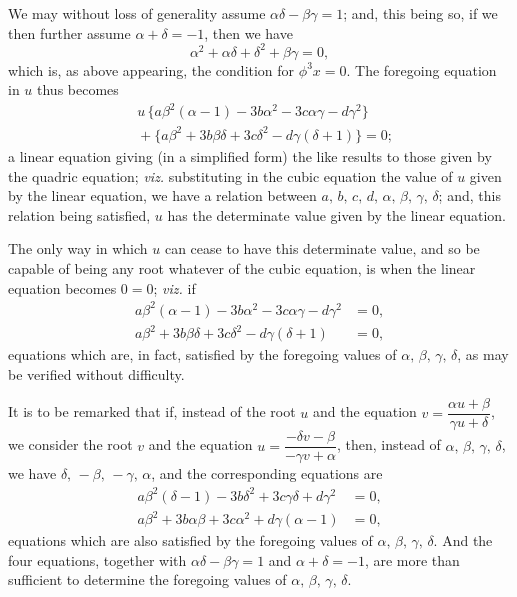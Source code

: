 \documentclass[11pt]{article}
\begin{document}
We may without loss of generality assume $\alpha \delta - \beta \gamma = 1$; and, this being so, if we
then further assume $\alpha + \delta = -1$, then we have
\[
  \alpha^{2} + \alpha \delta + \delta^{2} + \beta \gamma = 0,
\]
which is, as above appearing, the condition for $\phi^{3} x = 0$. The foregoing equation in $u$
thus becomes
\begin{align*}
  & u\,\{a \beta^{2}(\alpha - 1) - 3 b \alpha^{2} - 3 c \alpha \gamma - d \gamma^{2}\}\\
  & {} + \{a \beta^{2} + 3 b \beta \delta + 3 c \delta^{2} - d \gamma(\delta + 1)\} = 0;
\end{align*}
a linear equation giving (in a simplified form) the like results to those given by the
quadric equation; \emph{viz.} substituting in the cubic equation the value of $u$ given by the
linear equation, we have a relation between $a,\,b,\,c,\,d,\,\alpha,\,\beta,\,\gamma,\,\delta$; and, this relation
being satisfied, $u$ has the determinate value given by the linear equation.

\medskip
The only way in which $u$ can cease to have this determinate value, and so be
capable of being any root whatever of the cubic equation, is when the linear equation
becomes $0 = 0$; \emph{viz.} if
\begin{align*}
  a \beta^{2}(\alpha - 1) - 3 b \alpha^{2} - 3 c \alpha \gamma - d \gamma^{2} &= 0,\\
  a \beta^{2} + 3 b \beta \delta + 3 c \delta^{2} - d \gamma(\delta + 1) &= 0,
\end{align*}
equations which are, in fact, satisfied by the foregoing values of $\alpha,\,\beta,\,\gamma,\,\delta$, as may be
verified without difficulty.

\medskip
It is to be remarked that if, instead of the root $u$ and the equation
$v = \dfrac{\alpha u + \beta}{\gamma u + \delta}$, we consider the root $v$ and the equation
$u = \dfrac{- \delta v - \beta}{- \gamma v + \alpha}$, then, instead of $\alpha,\,\beta,\,\gamma,\,\delta$, we
have $\delta,\,-\beta,\,-\gamma,\,\alpha$, and the corresponding equations are
\begin{align*}
  a \beta^{2}(\delta - 1) - 3 b \delta^{2} + 3 c \gamma \delta + d \gamma^{2} &= 0,\\
  a \beta^{2} + 3 b \alpha \beta + 3 c \alpha^{2} + d \gamma(\alpha - 1) &= 0,
\end{align*}
equations which are also satisfied by the foregoing values of $\alpha,\,\beta,\,\gamma,\,\delta$. And the four
equations, together with $\alpha \delta - \beta \gamma = 1$ and $\alpha + \delta = -1$, are more than sufficient to determine
the foregoing values of $\alpha,\,\beta,\,\gamma,\,\delta$.
\end{document}
